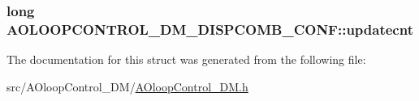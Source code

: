\hypertarget{structAOLOOPCONTROL__DM__DISPCOMB__CONF_a0eb7c648b544dbe4e15f5932be0f5043}{
\subsubsection[{updatecnt}]{\setlength{\rightskip}{0pt plus 5cm}long A\+O\+L\+O\+O\+P\+C\+O\+N\+T\+R\+O\+L\+\_\+\+D\+M\+\_\+\+D\+I\+S\+P\+C\+O\+M\+B\+\_\+\+C\+O\+N\+F\+::updatecnt}}\label{structAOLOOPCONTROL__DM__DISPCOMB__CONF_a0eb7c648b544dbe4e15f5932be0f5043}


The documentation for this struct was generated from the following file\+:\begin{DoxyCompactItemize}
\item 
src/\+A\+Oloop\+Control\+\_\+\+D\+M/\hyperlink{AOloopControl__DM_8h}{A\+Oloop\+Control\+\_\+\+D\+M.\+h}\end{DoxyCompactItemize}
